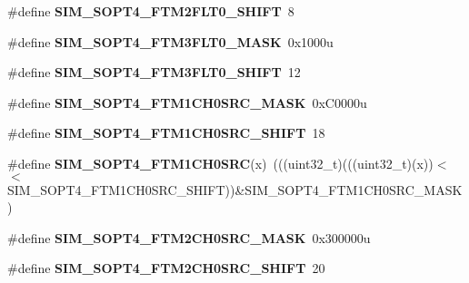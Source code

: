 \begin{DoxyCompactItemize}
\item 
\#define {\bfseries S\+I\+M\+\_\+\+S\+O\+P\+T4\+\_\+\+F\+T\+M2\+F\+L\+T0\+\_\+\+S\+H\+I\+FT}~8\hypertarget{group__SIM__Register__Masks_ga15275ae91c6efbf697f472b940369401}{}\label{group__SIM__Register__Masks_ga15275ae91c6efbf697f472b940369401}

\item 
\#define {\bfseries S\+I\+M\+\_\+\+S\+O\+P\+T4\+\_\+\+F\+T\+M3\+F\+L\+T0\+\_\+\+M\+A\+SK}~0x1000u\hypertarget{group__SIM__Register__Masks_ga94a2b4111642b78585a992d67795b04c}{}\label{group__SIM__Register__Masks_ga94a2b4111642b78585a992d67795b04c}

\item 
\#define {\bfseries S\+I\+M\+\_\+\+S\+O\+P\+T4\+\_\+\+F\+T\+M3\+F\+L\+T0\+\_\+\+S\+H\+I\+FT}~12\hypertarget{group__SIM__Register__Masks_ga9a9a64cd84c357ba5c5459aca027465c}{}\label{group__SIM__Register__Masks_ga9a9a64cd84c357ba5c5459aca027465c}

\item 
\#define {\bfseries S\+I\+M\+\_\+\+S\+O\+P\+T4\+\_\+\+F\+T\+M1\+C\+H0\+S\+R\+C\+\_\+\+M\+A\+SK}~0x\+C0000u\hypertarget{group__SIM__Register__Masks_ga8be459723f070708becab666dc6abc47}{}\label{group__SIM__Register__Masks_ga8be459723f070708becab666dc6abc47}

\item 
\#define {\bfseries S\+I\+M\+\_\+\+S\+O\+P\+T4\+\_\+\+F\+T\+M1\+C\+H0\+S\+R\+C\+\_\+\+S\+H\+I\+FT}~18\hypertarget{group__SIM__Register__Masks_gaee4e8fb1805bded49220a407c1620345}{}\label{group__SIM__Register__Masks_gaee4e8fb1805bded49220a407c1620345}

\item 
\#define {\bfseries S\+I\+M\+\_\+\+S\+O\+P\+T4\+\_\+\+F\+T\+M1\+C\+H0\+S\+RC}(x)~(((uint32\+\_\+t)(((uint32\+\_\+t)(x))$<$$<$S\+I\+M\+\_\+\+S\+O\+P\+T4\+\_\+\+F\+T\+M1\+C\+H0\+S\+R\+C\+\_\+\+S\+H\+I\+FT))\&S\+I\+M\+\_\+\+S\+O\+P\+T4\+\_\+\+F\+T\+M1\+C\+H0\+S\+R\+C\+\_\+\+M\+A\+SK)\hypertarget{group__SIM__Register__Masks_gaafa0324827d777673c2170317942e24b}{}\label{group__SIM__Register__Masks_gaafa0324827d777673c2170317942e24b}

\item 
\#define {\bfseries S\+I\+M\+\_\+\+S\+O\+P\+T4\+\_\+\+F\+T\+M2\+C\+H0\+S\+R\+C\+\_\+\+M\+A\+SK}~0x300000u\hypertarget{group__SIM__Register__Masks_ga0dcacc22852e0ee0a7a853a51b422b70}{}\label{group__SIM__Register__Masks_ga0dcacc22852e0ee0a7a853a51b422b70}

\item 
\#define {\bfseries S\+I\+M\+\_\+\+S\+O\+P\+T4\+\_\+\+F\+T\+M2\+C\+H0\+S\+R\+C\+\_\+\+S\+H\+I\+FT}~20\hypertarget{group__SIM__Register__Masks_ga04d4aa6612f4d2df7d9e0e85f15f6dd6}{}\label{group__SIM__Register__Masks_ga04d4aa6612f4d2df7d9e0e85f15f6dd6}


\end{DoxyCompactItemize}
